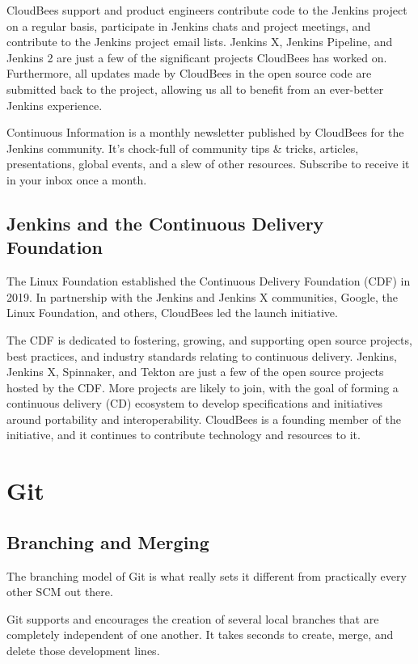 \tab CloudBees support and product engineers contribute code to the Jenkins project on a regular basis, participate in Jenkins chats and project meetings, and contribute to the Jenkins project email lists. Jenkins X, Jenkins Pipeline, and Jenkins 2 are just a few of the significant projects CloudBees has worked on. Furthermore, all updates made by CloudBees in the open source code are submitted back to the project, allowing us all to benefit from an ever-better Jenkins experience.

\tab Continuous Information is a monthly newsletter published by CloudBees for the Jenkins community. It's chock-full of community tips & tricks, articles, presentations, global events, and a slew of other resources. Subscribe to receive it in your inbox once a month.

\subsection*{Jenkins and the Continuous Delivery Foundation}
\tab The Linux Foundation established the Continuous Delivery Foundation (CDF) in 2019. In partnership with the Jenkins and Jenkins X communities, Google, the Linux Foundation, and others, CloudBees led the launch initiative.

\tab The CDF is dedicated to fostering, growing, and supporting open source projects, best practices, and industry standards relating to continuous delivery. Jenkins, Jenkins X, Spinnaker, and Tekton are just a few of the open source projects hosted by the CDF. More projects are likely to join, with the goal of forming a continuous delivery (CD) ecosystem to develop specifications and initiatives around portability and interoperability. CloudBees is a founding member of the initiative, and it continues to contribute technology and resources to it.

\section {Git}
\subsection*{Branching and Merging}
\tab The branching model of Git \cite{git} is what really sets it different from practically every other SCM out there.

\tab Git supports and encourages the creation of several local branches that are completely independent of one another. It takes seconds to create, merge, and delete those development lines.

